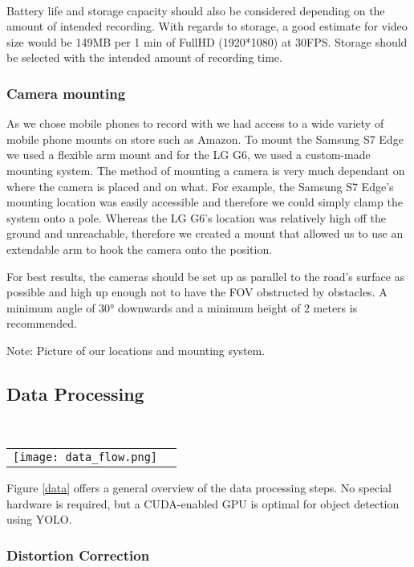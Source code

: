 \ \\
Battery life and storage capacity should also be considered depending on the amount of intended recording. 
With regards to storage, a good estimate for video size would be 149MB per 1 min of FullHD (1920*1080) at 30FPS. Storage should be selected
with the intended amount of recording time.

\subsubsection{Camera mounting}

As we chose mobile phones to record with we had access to a wide variety of mobile phone mounts on store such as Amazon.
To mount the Samsung S7 Edge we used a flexible arm mount and for the LG G6, we used a custom-made mounting system.
The method of mounting a camera is very much dependant on where the camera is placed and on what. For example, the Samsung S7 Edge's
mounting location was easily accessible and therefore we could simply clamp the system onto a pole. Whereas the LG G6's location was relatively 
high off the ground and unreachable, therefore we created a mount that allowed us to use an extendable arm to hook the camera onto the position.

For best results, the cameras should be set up as parallel to the road's surface as possible and high up enough not to have the FOV obstructed by obstacles.
A minimum angle of 30° downwards and a minimum height of 2 meters is recommended.

Note: Picture of our locations and mounting system.

\subsection{Data Processing}

\ \\ 
\noindent
\begin{tabular}{@{}cc}
\texttt{[image: data\_flow.png]} 
\end{tabular}
\label{data}


Figure \ref{data} offers a general overview of the data processing steps. No special hardware is required, but a CUDA-enabled GPU is optimal for object detection using YOLO.
\ \\
\subsubsection{Distortion Correction}

